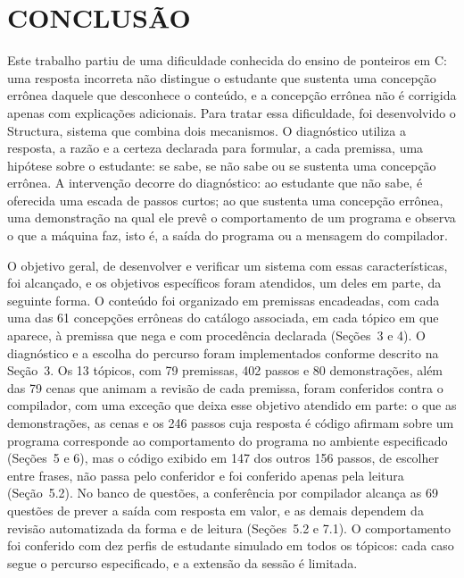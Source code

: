 
\chapter{\texorpdfstring{\mbox{CONCLUSÃO}}{CONCLUSÃO}}\label{cap:8}

Este trabalho partiu de uma dificuldade conhecida do ensino de ponteiros em C: uma resposta incorreta não distingue o estudante que sustenta uma concepção errônea daquele que desconhece o conteúdo, e a concepção errônea não é corrigida apenas com explicações adicionais. Para tratar essa dificuldade, foi desenvolvido o Structura, sistema que combina dois mecanismos. O diagnóstico utiliza a resposta, a razão e a certeza declarada para formular, a cada premissa, uma hipótese sobre o estudante: se sabe, se não sabe ou se sustenta uma concepção errônea. A intervenção decorre do diagnóstico: ao estudante que não sabe, é oferecida uma escada de passos curtos; ao que sustenta uma concepção errônea, uma demonstração na qual ele prevê o comportamento de um programa e observa o que a máquina faz, isto é, a saída do programa ou a mensagem do compilador.

O objetivo geral, de desenvolver e verificar um sistema com essas características, foi alcançado, e os objetivos específicos foram atendidos, um deles em parte, da seguinte forma. O conteúdo foi organizado em premissas encadeadas, com cada uma das 61 concepções errôneas do catálogo associada, em cada tópico em que aparece, à premissa que nega e com procedência declarada (Seções~3 e 4). O diagnóstico e a escolha do percurso foram implementados conforme descrito na Seção~3. Os 13 tópicos, com 79 premissas, 402 passos e 80 demonstrações, além das 79 cenas que animam a revisão de cada premissa, foram conferidos contra o compilador, com uma exceção que deixa esse objetivo atendido em parte: o que as demonstrações, as cenas e os 246 passos cuja resposta é código afirmam sobre um programa corresponde ao comportamento do programa no ambiente especificado (Seções~5 e 6), mas o código exibido em 147 dos outros 156 passos, de escolher entre frases, não passa pelo conferidor e foi conferido apenas pela leitura (Seção~5.2). No banco de questões, a conferência por compilador alcança as 69 questões de prever a saída com resposta em valor, e as demais dependem da revisão automatizada da forma e de leitura (Seções~5.2 e 7.1). O comportamento foi conferido com dez perfis de estudante simulado em todos os tópicos: cada caso segue o percurso especificado, e a extensão da sessão é limitada.

